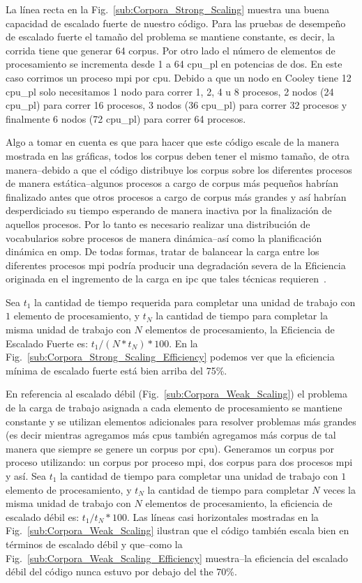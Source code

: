 {La línea recta en la Fig.~\ref{sub:Corpora_Strong_Scaling} muestra una buena capacidad de escalado fuerte de nuestro código.
Para las pruebas de desempeño de escalado fuerte el tamaño del problema se mantiene constante, es decir, la corrida tiene que generar 64 corpus.
Por otro lado el número de elementos de procesamiento se incrementa desde 1 a 64 \gls{cpu_pl} en potencias de dos.
En este caso corrimos un proceso \gls{mpi} por \gls{cpu}.
Debido a que un nodo en Cooley tiene 12 \gls{cpu_pl} solo necesitamos 1 nodo para correr 1, 2, 4 u 8 procesos, 2 nodos (24 \gls{cpu_pl}) para correr 16 procesos, 3 nodos (36 \gls{cpu_pl}) para correr 32 procesos y finalmente 6 nodos (72 \gls{cpu_pl}) para correr 64 procesos.

Algo a tomar en cuenta es que para hacer que este código escale de la manera mostrada en las gráficas, todos los corpus deben tener el mismo tamaño, de otra manera--debido a que el código distribuye los corpus sobre los diferentes procesos de manera estática--algunos procesos a cargo de corpus más pequeños habrían finalizado antes que otros procesos a cargo de corpus más grandes y así habrían desperdiciado su tiempo esperando de manera inactiva por la finalización de aquellos procesos.
Por lo tanto es necesario realizar una distribución de vocabularios sobre procesos de manera dinámica--así como la planificación dinámica en \gls{omp}.
De todas formas, tratar de balancear la carga entre los diferentes procesos \gls{mpi} podría producir una degradación severa de la Eficiencia originada en el ingremento de la carga en \gls{ipc} que tales técnicas requieren~\cite{hu2012biophysically}.

Sea $t_1$ la cantidad de tiempo requerida para completar una unidad de trabajo con $1$ elemento de procesamiento, y $t_N$ la cantidad de tiempo para completar la misma unidad de trabajo con $N$ elementos de procesamiento, la Eficiencia de Escalado Fuerte es: $t_1 / (N * t_N) * 100$. En la Fig.~\ref{sub:Corpora_Strong_Scaling_Efficiency} podemos ver que la eficiencia mínima de escalado fuerte está bien arriba del 75\%.

En referencia al escalado débil (Fig.~\ref{sub:Corpora_Weak_Scaling}) el problema de la carga de trabajo asignada a cada elemento de procesamiento se mantiene constante y se utilizan elementos adicionales para resolver problemas más grandes (es decir mientras agregamos más \glspl{cpu} también agregamos más corpus de tal manera que siempre se genere un corpus por \gls{cpu}).
Generamos un corpus por proceso utilizando: un corpus por proceso \gls{mpi}, dos corpus para dos procesos \gls{mpi} y así.
Sea $t_1$ la cantidad de tiempo para completar una unidad de trabajo con $1$ elemento de procesamiento, y $t_N$ la cantidad de tiempo para completar $N$ veces la misma unidad de trabajo con $N$ elementos de procesamiento, la eficiencia de escalado débil es: $t_1 / t_N * 100$. Las líneas casi horizontales mostradas en la Fig.~\ref{sub:Corpora_Weak_Scaling} ilustran que el código también escala bien en términos de escalado débil y que--como la Fig.~\ref{sub:Corpora_Weak_Scaling_Efficiency} muestra--la eficiencia del escalado débil del código nunca estuvo por debajo del the 70\%.
}{
}
